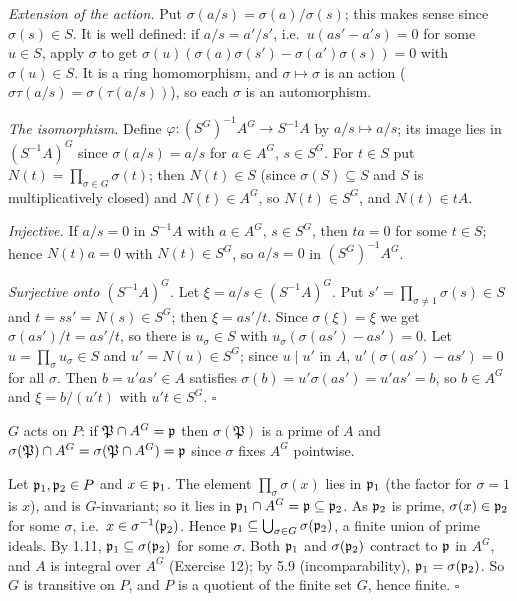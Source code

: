 \documentclass[11pt]{article}
\begin{document}
\emph{Extension of the action.} Put $\sigma(a/s)=\sigma(a)/\sigma(s)$; this makes sense since $\sigma(s)\in S$. It is well defined: if $a/s=a'/s'$, i.e.\ $u(as'-a's)=0$ for some $u\in S$, apply $\sigma$ to get $\sigma(u)(\sigma(a)\sigma(s')-\sigma(a')\sigma(s))=0$ with $\sigma(u)\in S$. It is a ring homomorphism, and $\sigma\mapsto\sigma$ is an action ($\sigma\tau(a/s)=\sigma(\tau(a/s))$), so each $\sigma$ is an automorphism.

\emph{The isomorphism.} Define $\varphi:(S^G)^{-1}A^G\to S^{-1}A$ by $a/s\mapsto a/s$; its image lies in $(S^{-1}A)^G$ since $\sigma(a/s)=a/s$ for $a\in A^G$, $s\in S^G$. For $t\in S$ put $N(t)=\prod_{\sigma\in G}\sigma(t)$; then $N(t)\in S$ (since $\sigma(S)\subseteq S$ and $S$ is multiplicatively closed) and $N(t)\in A^G$, so $N(t)\in S^G$, and $N(t)\in tA$.

\emph{Injective.} If $a/s=0$ in $S^{-1}A$ with $a\in A^G$, $s\in S^G$, then $ta=0$ for some $t\in S$; hence $N(t)a=0$ with $N(t)\in S^G$, so $a/s=0$ in $(S^G)^{-1}A^G$.

\emph{Surjective onto $(S^{-1}A)^G$.} Let $\xi=a/s\in(S^{-1}A)^G$. Put $s'=\prod_{\sigma\ne1}\sigma(s)\in S$ and $t=ss'=N(s)\in S^G$; then $\xi=as'/t$. Since $\sigma(\xi)=\xi$ we get $\sigma(as')/t=as'/t$, so there is $u_\sigma\in S$ with $u_\sigma(\sigma(as')-as')=0$. Let $u=\prod_\sigma u_\sigma\in S$ and $u'=N(u)\in S^G$; since $u\mid u'$ in $A$, $u'(\sigma(as')-as')=0$ for all $\sigma$. Then $b=u'as'\in A$ satisfies $\sigma(b)=u'\sigma(as')=u'as'=b$, so $b\in A^G$ and $\xi=b/(u't)$ with $u't\in S^G$. \hfill$\square$

\pf
$G$ acts on $P$: if $\mathfrak P\cap A^G=\mathfrak p$ then $\sigma(\mathfrak P)$ is a prime of $A$ and $\sigma(\mathfrak P)\cap A^G=\sigma(\mathfrak P\cap A^G)=\mathfrak p$ since $\sigma$ fixes $A^G$ pointwise.

Let $\mathfrak p_1,\mathfrak p_2\in P$ and $x\in\mathfrak p_1$. The element $\prod_\sigma\sigma(x)$ lies in $\mathfrak p_1$ (the factor for $\sigma=1$ is $x$), and is $G$-invariant; so it lies in $\mathfrak p_1\cap A^G=\mathfrak p\subseteq\mathfrak p_2$. As $\mathfrak p_2$ is prime, $\sigma(x)\in\mathfrak p_2$ for some $\sigma$, i.e.\ $x\in\sigma^{-1}(\mathfrak p_2)$. Hence $\mathfrak p_1\subseteq\bigcup_{\sigma\in G}\sigma(\mathfrak p_2)$, a finite union of prime ideals. By 1.11, $\mathfrak p_1\subseteq\sigma(\mathfrak p_2)$ for some $\sigma$. Both $\mathfrak p_1$ and $\sigma(\mathfrak p_2)$ contract to $\mathfrak p$ in $A^G$, and $A$ is integral over $A^G$ (Exercise 12); by 5.9 (incomparability), $\mathfrak p_1=\sigma(\mathfrak p_2)$. So $G$ is transitive on $P$, and $P$ is a quotient of the finite set $G$, hence finite. \hfill$\square$
\end{document}
